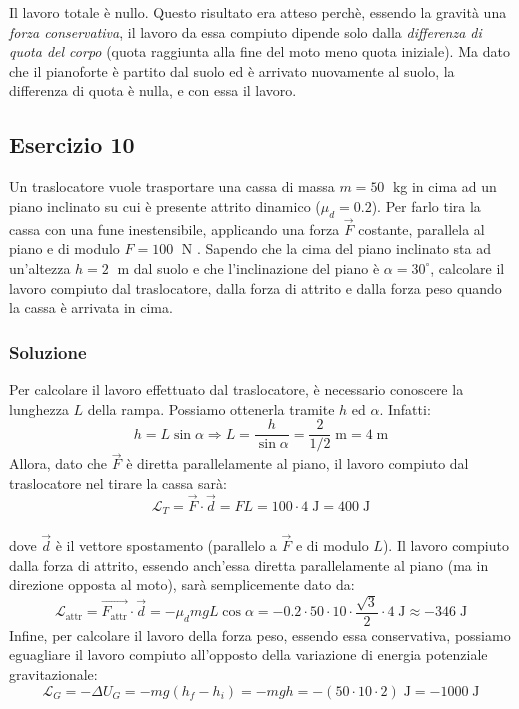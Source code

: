 \documentclass[12pt,a4paper]{book}
\begin{document}
Il lavoro totale è nullo. Questo risultato era atteso perchè, essendo la gravità una \textit{forza conservativa}, il lavoro da essa compiuto dipende solo dalla \textit{differenza di quota del corpo} (quota raggiunta alla fine del moto meno quota iniziale). Ma dato che il pianoforte è partito dal suolo ed è arrivato nuovamente al suolo, la differenza di quota è nulla, e con essa il lavoro.\\

\subsection*{Esercizio 10}
Un traslocatore vuole trasportare una cassa di massa $m=50 \;$ kg in cima ad un piano inclinato su cui è presente attrito dinamico ($\mu_d = 0.2$). Per farlo tira la cassa con una fune inestensibile, applicando una forza $\vec{F}$ costante, parallela al piano e di modulo $F=100 \;$ N . Sapendo che la cima del piano inclinato sta ad un'altezza $h=2 \;$ m dal suolo e che l'inclinazione del piano è $\alpha=30^{\circ}$, calcolare il lavoro compiuto dal traslocatore, dalla forza di attrito e dalla forza peso quando la cassa è arrivata in cima.

\subsubsection*{Soluzione}
Per calcolare il lavoro effettuato dal traslocatore, è necessario conoscere la lunghezza $L$ della rampa. Possiamo ottenerla tramite $h$ ed $\alpha$. Infatti: 
\begin{equation*}
h=L \sin\alpha \Longrightarrow L = \frac{h}{\sin\alpha} = \frac{2}{1/2} \; \text{m} = 4 \; \text{m}
\end{equation*}
Allora, dato che $\vec{F}$ è diretta parallelamente al piano, il lavoro compiuto dal traslocatore nel tirare la cassa sarà:
\begin{equation*}
\mathcal{L}
_T = \vec{F} \cdot \vec{d} = FL = 100 \cdot 4 \; \text{J} = 400 \; \text{J}
\end{equation*}\\
dove $\vec{d}$ è il vettore spostamento (parallelo a $\vec{F}$ e di modulo $L$). 
Il lavoro compiuto dalla forza di attrito, essendo anch'essa diretta parallelamente al piano (ma in direzione opposta al moto), sarà semplicemente dato da:\\
\begin{equation*}
\mathcal{L}
_{\text{attr}} =  \vec{F_{\text{attr}}} \cdot \vec{d} = - \mu_d m g L \cos\alpha  = - 0.2 \cdot 50 \cdot 10 \cdot \frac{\sqrt{3}}{2} \cdot 4 \; \text{J} \approx - 346 \; \text{J}
\end{equation*}
Infine, per calcolare il lavoro della forza peso, essendo essa conservativa, possiamo eguagliare il lavoro compiuto all'opposto della variazione di energia potenziale gravitazionale:\\
\begin{equation*}
\mathcal{L}
_G = - \Delta U_G = -m g (h_{f} - h_{i}) = -mgh = - (50\cdot 10 \cdot 2) \; \text{J}= -1000 \; \text{J}
\end{equation*}\\
\end{document}
